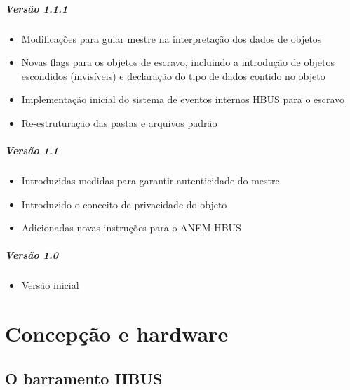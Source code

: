 \documentclass[11pt]{report}
\begin{document}
\subsubsection{Versão 1.1.1}

\begin{itemize}

\item Modificações para guiar mestre na interpretação dos dados de objetos
\item Novas flags para os objetos de escravo, incluindo a introdução de objetos escondidos (invisíveis) e declaração do tipo de dados contido no objeto
\item Implementação inicial do sistema de eventos internos HBUS para o escravo
\item Re-estruturação das pastas e arquivos padrão

\end{itemize}

\subsubsection{Versão 1.1}

\begin{itemize}
\item Introduzidas medidas para garantir autenticidade do mestre
\item Introduzido o conceito de privacidade do objeto
\item Adicionadas novas instruções para o ANEM-HBUS
\end{itemize}

\subsubsection{Versão 1.0}
\begin{itemize}

\item Versão inicial

\end{itemize}

\part{Concepção e hardware}

\chapter{O barramento HBUS}


\end{document}
